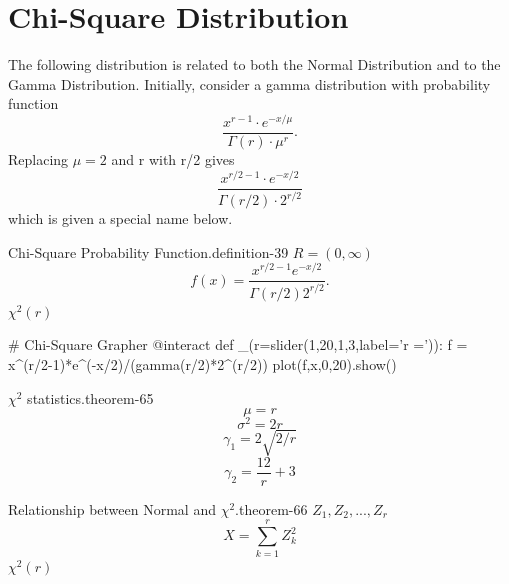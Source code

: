 \documentclass[10pt,]{book}
\numberwithin{equation}{section}
\begin{document}
\section[{Chi-Square Distribution}]{Chi-Square Distribution}\label{section-59}
\hypertarget{p-1247}{}%
The following distribution is related to both the Normal Distribution and to the Gamma Distribution. Initially, consider a gamma distribution with probability function%
\begin{equation*}
\frac{x^{r-1} \cdot e^{-x / \mu}}{\Gamma(r) \cdot \mu^r}.
\end{equation*}
Replacing \(\mu = 2\) and r with r/2 gives%
\begin{equation*}
\frac{x^{r/2-1} \cdot e^{-x/2}}{\Gamma(r/2) \cdot 2^{r/2}}
\end{equation*}
which is given a special name below.%
\par
\hypertarget{p-1248}{}%
\begin{definition}{Chi-Square Probability Function.}{definition-39}%
\(R = (0,\infty)\)%
\begin{equation*}
f(x) = \frac{x^{r/2-1} e^{-x/2} }{\Gamma(r/2) 2^{r/2}}.
\end{equation*}
\(\chi^2(r)\)\end{definition}
%
\par
\hypertarget{p-1249}{}%
\leavevmode%
\begin{sageinput}
# Chi-Square Grapher
@interact
def _(r=slider(1,20,1,3,label='r =')):
    f = x^(r/2-1)*e^(-x/2)/(gamma(r/2)*2^(r/2))
    plot(f,x,0,20).show()
\end{sageinput}
%
\par
\hypertarget{p-1250}{}%
\begin{theorem}{\(\chi^2\) statistics.}{}{theorem-65}%
%
\begin{equation*}
\mu = r
\end{equation*}
%
\begin{equation*}
\sigma^2 = 2r
\end{equation*}
%
\begin{equation*}
\gamma_1 = 2 \sqrt{2/r}
\end{equation*}
%
\begin{equation*}
\gamma_2 = \frac{12}{r} + 3
\end{equation*}
\end{theorem}
%
\par
\hypertarget{p-1251}{}%
\begin{theorem}{Relationship between Normal and \(\chi^2\).}{}{theorem-66}%
\(Z_1, Z_2, ..., Z_r\)%
\begin{equation*}
X = \sum_{k=1}^r Z_k^2
\end{equation*}
\(\chi^2(r)\)\end{theorem}
\end{document}
